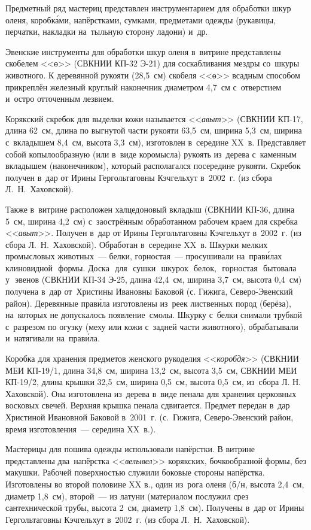 Предметный ряд мастериц представлен инструментарием для обработки шкур оленя, коробк\'{а}ми, напёрстками, сумками, предметами одежды (рукавицы, перчатки, накладки на~тыльную сторону ладони) и~др.

Эвенские инструменты для обработки шкур оленя в~витрине представлены скобелем <<ө>> (СВКНИИ КП-32 Э-21) для соскабливания мездры со~шкуры животного. К деревянной рукояти (28,5~см) скобеля <<ө>> всадным способом прикреплён железный круглый наконечник диаметром 4,7~см с~отверстием и~остро отточенным лезвием.

Корякский скребок для выделки кожи называется <<\textit{авыт}>> (СВКНИИ КП-17, длина 62~см, длина по выгнутой части рукояти 63,5~см, ширина 5,3~см, ширина с~вкладышем 8,4~см, высота 3,3~см), изготовлен в~середине XX~в. Представляет собой копылообразную (или в~виде коромысла) рукоять из~дерева с~каменным вкладышем (наконечником), который располагался посередине рукояти. Скребок получен в~дар от Ирины Гергольтаговны Кэчгельхут в~2002~г. (из сбора Л.~Н.~Хаховской).

Также в~витрине расположен халцедоновый вкладыш (СВКНИИ КП-36, длина 5~см, ширина 4,2~см) с~заострённым обработанном рабочем краем для скребка <<\textit{авыт}>>. Получен в~дар от Ирины Гергольтаговны Кэчгельхут в~2002~г. (из сбора Л.~Н.~Хаховской). Обработан в~середине XX~в.
\clearpage
Шкурки мелких промысловых животных~--- белки, горностая~--- просушивали на~прав\'{и}лах клиновидной\,\,\,\,формы. Доска\,\,\,\,для\,\,\,\,сушки\,\,\,\,шкурок\,\,\,\,белок,\,\,\,\,горностая\,\,\,\,бытовала\,\,\,\,у\,\,\,\,эвенов (СВКНИИ КП-34 Э-25, длина 42,4~см, ширина 3,7~см, высота 0,4~см) получена в~дар от~Христины Ивановны Баковой (с. Гижига, Северо-Эвенский район). Деревянные прав\'{и}ла изготовлены из~реек лиственных пород (берёза), на~которых не допускалось появление~смолы. Шкурку с~белки снимали трубкой с~разрезом по огузку (меху или кожи с~задней части животного), обрабатывали и~натягивали на~прав\'{и}ла.

Коробка для хранения предметов женского рукоделия <<\textit{коробдя}>> (СВКНИИ МЕИ КП-19/1, длина 34,8~см, ширина 13,2~см, высота 3,5~см, СВКНИИ МЕИ КП-19/2, длина крышки 32,5~см, ширина 0,5~см, высота 0,5~см, из~сбора Л. Н. Хаховской). Она изготовлена из~дерева в~виде пенала для хранения церковных восковых свечей. Верхняя крышка пенала сдвигается. Предмет передан в~дар Христиной Ивановной Баковой в~2001~г. (с.~Гижига, Северо-Эвенский район, время изготовления~--- середина XX~в.).

Мастерицы для пошива одежды использовали напёрстки. В витрине представлены два~напёрстка <<\textit{велывел}>> корякских, бочкообразной формы, без макушки. Рабочей поверхностью служили боковые стороны напёрстка. Изготовлены во второй половине XX в., один из~рога оленя (б/н, высота 2,4~см, диаметр 1,8~см), второй~--- из латуни (материалом послужил срез сантехнической трубы, высота 2~см, диаметр 1,8~см). Получены в~дар от Ирины Гергольтаговны Кэчгельхут в~2002~г. (из сбора Л.~Н.~Хаховской).

